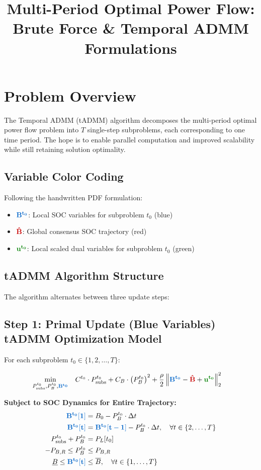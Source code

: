 \documentclass[11pt]{article}
\title{Multi-Period Optimal Power Flow:\\Brute Force \& Temporal ADMM Formulations}
\author{}
\date{}
\newcommand{\blueB}[1]{\textcolor{bluevar}{\mathbf{#1}}}      %
\newcommand{\redBhat}[1]{\textcolor{redvar}{\mathbf{#1}}}     %
\newcommand{\greenu}[1]{\textcolor{greenvar}{\mathbf{#1}}}    %
\begin{document}
\maketitle

\section{Problem Overview}

The Temporal ADMM (tADMM) algorithm decomposes the multi-period optimal power flow problem into $T$ single-step subproblems, each corresponding to one time period. The hope is to enable parallel computation and improved scalability while still retaining solution optimality.

\subsection{Variable Color Coding}
Following the handwritten PDF formulation:
\begin{itemize}
    \item $\blueB{B^{t_0}}$: Local SOC variables for subproblem $t_0$ (blue)
    \item $\redBhat{\hat{B}}$: Global consensus SOC trajectory (red)
    \item $\greenu{u^{t_0}}$: Local scaled dual variables for subproblem $t_0$ (green)
\end{itemize}

\subsection{tADMM Algorithm Structure}

The algorithm alternates between three update steps:

\subsection{Step 1: Primal Update (Blue Variables) tADMM Optimization Model}
For each subproblem $t_0 \in \{1, 2, \ldots, T\}$:

\begin{align}
\min_{P_{\text{subs}}^{t_0}, P_{B}^{t_0}, \blueB{B^{t_0}}} \quad & C^{t_0} \cdot P_{\text{subs}}^{t_0} + C_B \cdot \left(P_{B}^{t_0}\right)^2 + \frac{\rho}{2} \left\| \blueB{B^{t_0}} - \redBhat{\hat{B}} + \greenu{u^{t_0}} \right\|_2^2
\end{align}

\textbf{Subject to SOC Dynamics for Entire Trajectory:}
\begin{align}
\blueB{B^{t_0}[1]} &= B_0 - P_{B}^{t_0} \cdot \Delta t \\
\blueB{B^{t_0}[t]} &= \blueB{B^{t_0}[t-1]} - P_{B}^{t_0} \cdot \Delta t, \quad \forall t \in \{2, \ldots, T\} \\
P_{\text{subs}}^{t_0} + P_{B}^{t_0} &= P_L[t_0] \\
-P_{B,R} \leq P_{B}^{t_0} &\leq P_{B,R} \\
\underline{B} \leq \blueB{B^{t_0}[t]} &\leq \overline{B}, \quad \forall t \in \{1, \ldots, T\}
\end{align}
\end{document}
